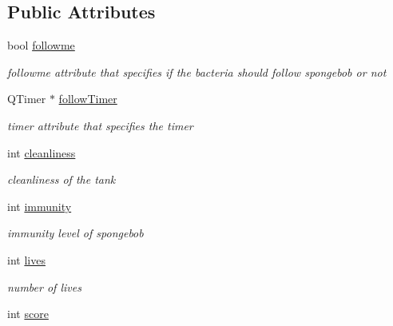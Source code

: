 \subsection*{Public Attributes}
\begin{DoxyCompactItemize}
\item 
\hypertarget{classSpongeBob_a124a05c347340041b19c187b0e11d28e}{bool \hyperlink{classSpongeBob_a124a05c347340041b19c187b0e11d28e}{followme}}\label{classSpongeBob_a124a05c347340041b19c187b0e11d28e}

\begin{DoxyCompactList}\small\item\em followme attribute that specifies if the bacteria should follow spongebob or not \end{DoxyCompactList}\item 
\hypertarget{classSpongeBob_aaa7f8e848ec158ce5d03e3a782026d6d}{Q\-Timer $\ast$ \hyperlink{classSpongeBob_aaa7f8e848ec158ce5d03e3a782026d6d}{follow\-Timer}}\label{classSpongeBob_aaa7f8e848ec158ce5d03e3a782026d6d}

\begin{DoxyCompactList}\small\item\em timer attribute that specifies the timer \end{DoxyCompactList}\item 
\hypertarget{classSpongeBob_a09c3ee16b44a4a89a014f6055868a9e5}{int \hyperlink{classSpongeBob_a09c3ee16b44a4a89a014f6055868a9e5}{cleanliness}}\label{classSpongeBob_a09c3ee16b44a4a89a014f6055868a9e5}

\begin{DoxyCompactList}\small\item\em cleanliness of the tank \end{DoxyCompactList}\item 
\hypertarget{classSpongeBob_a72a16aa8925690a274e869c0eb0a9fd5}{int \hyperlink{classSpongeBob_a72a16aa8925690a274e869c0eb0a9fd5}{immunity}}\label{classSpongeBob_a72a16aa8925690a274e869c0eb0a9fd5}

\begin{DoxyCompactList}\small\item\em immunity level of spongebob \end{DoxyCompactList}\item 
\hypertarget{classSpongeBob_a801b813e51511cb779f077e6b510eb56}{int \hyperlink{classSpongeBob_a801b813e51511cb779f077e6b510eb56}{lives}}\label{classSpongeBob_a801b813e51511cb779f077e6b510eb56}

\begin{DoxyCompactList}\small\item\em number of lives \end{DoxyCompactList}\item 
\hypertarget{classSpongeBob_a24b14e1237cb158488cb1bcf84b42d13}{int \hyperlink{classSpongeBob_a24b14e1237cb158488cb1bcf84b42d13}{score}}\label{classSpongeBob_a24b14e1237cb158488cb1bcf84b42d13}


\end{DoxyCompactItemize}
